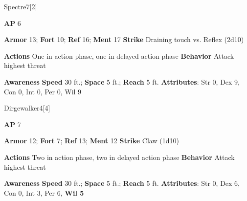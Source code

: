 \begin{monsection}{Spectre}{7}[2]
\vspace{-1em}\vspace{-1em}
\begin{spellcontent}
\begin{spelltargetinginfo}
{\textbf{AP} 6}

\pari \textbf{Armor} 13;
\textbf{Fort} 10;
\textbf{Ref} 16;
\textbf{Ment} 17
\pari \textbf{Strike} Draining touch  vs. Reflex (2d10)


\pari \textbf{Actions} One in action phase, one in delayed action phase
\pari \textbf{Behavior} Attack highest threat
\end{spelltargetinginfo}
\end{spellcontent}

\begin{monsterfooter}
\pari \textbf{Awareness} 
\pari \textbf{Speed} 30 ft.;
\textbf{Space} 5 ft.;
\textbf{Reach} 5 ft.
\pari \textbf{Attributes}:
Str 0,
Dex 9,
Con 0,
Int 0,
Per 0,
Wil 9
\end{monsterfooter}
\end{monsection}





\begin{monsection}{Dirgewalker}{4}[4]
\vspace{-1em}\vspace{-1em}
\begin{spellcontent}
\begin{spelltargetinginfo}
{\textbf{AP} 7}

\pari \textbf{Armor} 12;
\textbf{Fort} 7;
\textbf{Ref} 13;
\textbf{Ment} 12
\pari \textbf{Strike} Claw  (1d10)


\pari \textbf{Actions} Two in action phase, two in delayed action phase
\pari \textbf{Behavior} Attack highest threat
\end{spelltargetinginfo}
\end{spellcontent}

\begin{monsterfooter}
\pari \textbf{Awareness} 
\pari \textbf{Speed} 30 ft.;
\textbf{Space} 5 ft.;
\textbf{Reach} 5 ft.
\pari \textbf{Attributes}:
Str 0,
Dex 6,
Con 0,
Int 3,
Per 6,
\textbf{Wil 5}
\end{monsterfooter}
\end{monsection}


